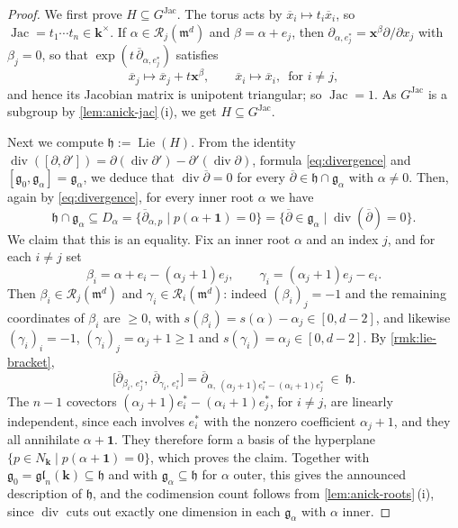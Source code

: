 \documentclass[11pt,letterpaper,reqno]{amsart}
\theoremstyle{remark}
\theoremstyle{definition}
\def\M{\mathfrak{m}}
\def\XX{\mathbf{x}}
\newcommand{\KK}[0]{\ensuremath{\mathbf{k}}}
\newcommand{\R}{\mathcal R}
\newcommand{\jac}[0]{\ensuremath{\operatorname{Jac}}}
\newcommand{\divi}[0]{\ensuremath{\operatorname{div}}}
\begin{document}
\begin{proof}
We first prove $H\subseteq G^{\jac}$. The torus acts by $\overline x_i\mapsto t_i\overline x_i$, so $\jac=t_1\cdots t_n\in\KK^\times$. If $\alpha\in\R_j(\M^d)$ and
$\beta=\alpha+e_j$, then $\partial_{\alpha,e_j^*}=\XX^{\beta}\partial/\partial x_j$ with $\beta_j=0$, so that $\exp(t\,\overline\partial_{\alpha,e_j^*})$ satisfies
\[\overline{x}_j\mapsto \overline{x}_j+t\XX^{\beta},\qquad \overline{x}_i\mapsto \overline{x}_i,\, \text{ for }i\neq j,\]
and hence its Jacobian matrix is unipotent triangular; so $\jac=1$. As $G^{\jac}$ is a subgroup by \cref{lem:anick-jac}\,\textup{(i)}, we get $H\subseteq G^{\jac}$.

Next we compute $\mathfrak h:=\operatorname{Lie}(H)$. From the identity
$\divi([\partial,\partial'])=\partial(\divi \partial')-\partial'(\divi \partial)$, formula \eqref{eq:divergence} and $[\mathfrak g_0,\mathfrak g_\alpha]=\mathfrak g_\alpha$, we deduce that $\divi\overline{\partial}=0$ for every $\overline{\partial}\in\mathfrak h\cap\mathfrak g_\alpha$ with $\alpha\neq 0$. Then, again by \eqref{eq:divergence}, for every inner root $\alpha$ we have
\[\mathfrak h\cap\mathfrak g_\alpha\subseteq D_{\alpha}=\{\overline\partial_{\alpha,p}\mid p(\alpha+\mathbf 1)=0\}=\{\overline{\partial}\in\mathfrak g_\alpha\mid \divi(\overline{\partial})=0\}.\]
We claim that this is an equality. Fix an inner root $\alpha$ and an index $j$, and for
each $i\neq j$ set
$$
\beta_i=\alpha+e_i-(\alpha_j+1)e_j,\qquad \gamma_i=(\alpha_j+1)e_j-e_i.
$$
Then $\beta_i\in\R_j(\M^d)$ and $\gamma_i\in\R_i(\M^d)$: indeed $(\beta_i)_j=-1$ and the
remaining coordinates of $\beta_i$ are $\geq0$, with
$s(\beta_i)=s(\alpha)-\alpha_j\in[0,d-2]$, and likewise $(\gamma_i)_i=-1$,
$(\gamma_i)_j=\alpha_j+1\geq1$ and $s(\gamma_i)=\alpha_j\in[0,d-2]$. By
\cref{rmk:lie-bracket},
$$
\bigl[\overline\partial_{\beta_i,\,e_j^*},\ \overline\partial_{\gamma_i,\,e_i^*}\bigr]
=\overline\partial_{\alpha,\ (\alpha_j+1)e_i^*-(\alpha_i+1)e_j^*}\ \in\ \mathfrak h.
$$
The $n-1$ covectors $(\alpha_j+1)e_i^*-(\alpha_i+1)e_j^*$, for $i\neq j$, are linearly
independent, since each involves $e_i^*$ with the nonzero coefficient $\alpha_j+1$, and
they all annihilate $\alpha+\mathbf 1$. They therefore form a basis of the hyperplane
$\{p\in N_\KK\mid p(\alpha+\mathbf 1)=0\}$, which proves the claim. Together with
$\mathfrak g_0=\mathfrak{gl}_n(\KK)\subseteq\mathfrak h$ and with $\mathfrak g_\alpha\subseteq\mathfrak h$ for
$\alpha$ outer, this gives the announced description of $\mathfrak h$, and the codimension
count follows from \cref{lem:anick-roots}\,\textup{(i)}, since $\divi$ cuts out exactly one
dimension in each $\mathfrak g_\alpha$ with $\alpha$ inner.


\end{proof}
\end{document}
